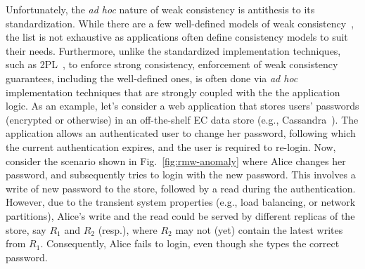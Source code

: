 Unfortunately, the \emph{ad hoc} nature of weak consistency is
antithesis to its standardization. While there are a few well-defined
models of weak consistency~\cite{terry-pdis94}, the list is not
exhaustive as applications often define consistency models to suit
their needs. Furthermore, unlike the standardized implementation
techniques, such as 2PL~\cite{2pl}, to enforce strong consistency,
enforcement of weak consistency guarantees, including the well-defined
ones, is often done via \emph{ad hoc} implementation techniques that
are strongly coupled with the the application logic. 
As an example, let's consider a web application that stores users'
passwords (encrypted or otherwise) in an off-the-shelf EC data store
(e.g., Cassandra~\cite{cassandra}). The application allows an
authenticated user to change her password, following which the current
authentication expires, and the user is required to re-login. Now,
consider the scenario shown in Fig.~\ref{fig:rmw-anomaly} where Alice
changes her password, and subsequently tries to login with the new
password. This involves a write of new password to the store, followed
by a read during the authentication.  However, due to the transient
system properties (e.g., load balancing, or network partitions),
Alice's write and the read could be served by different replicas of
the store, say $R_1$ and $R_2$ (resp.), where $R_2$ may not (yet)
contain the latest writes from $R_1$. Consequently, Alice fails to
login, even though she types the correct password.

